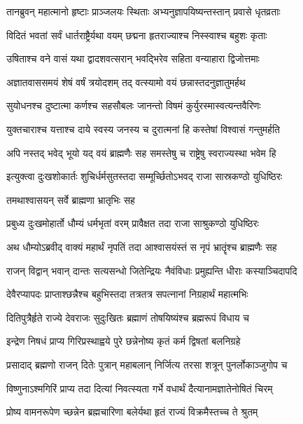 \twolineshloka
{तानब्रुवन् महात्मानो हृष्टाः प्राञ्जलयः स्थिताः}
{अभ्यनुज्ञापयिष्यन्तस्तान् प्रवासे धृतव्रताः}


\twolineshloka
{विदितं भवतां सर्वं धार्तराष्ट्रैर्यथा वयम्}
{छद्मना हृतराज्याश्च निस्स्वाश्च बहुशः कृताः}


\twolineshloka
{उषिताश्च वने वासं यथा द्वादशवत्सरान्}
{भवद्भिरेव सहिता वन्याहारा द्विजोत्तमाः}


\twolineshloka
{अज्ञातवाससमयं शेषं वर्षं त्रयोदशम्}
{तद् वत्स्यामो वयं छन्नास्तदनुज्ञातुमर्हथ}


\twolineshloka
{सुयोधनश्च दुष्टात्मा कर्णश्च सहसौबलः}
{जानन्तो विषमं कुर्युरस्मास्वत्यन्तवैरिणः}


\twolineshloka
{युक्तचाराश्च यत्ताश्च दाये स्वस्य जनस्य च}
{दुरात्मनां हि कस्तेषां विश्वासं गन्तुमर्हति}


\twolineshloka
{अपि नस्तद् भवेद् भूयो यद् वयं ब्राह्मणैः सह}
{समस्तेषु च राष्ट्रेषु स्वराज्यस्था भवेम हि}


\twolineshloka
{इत्युक्त्वा दुःखशोकार्तः शुचिर्धर्मसुतस्तदा}
{सम्मूर्च्छितोऽभवद् राजा सास्रकण्ठो युधिष्ठिरः}


\onelineshloka
{तमथाश्वासयन् सर्वे ब्राह्मणा भ्रातृभिः सह}

\twolineshloka
{प्रबुध्य दुःखमोहार्तो धौम्यं धर्मभृतां वरम्}
{प्रावैक्षत तदा राजा साश्रुकण्ठो युधिष्ठिरः}


\twolineshloka
{अथ धौम्योऽब्रवीद् वाक्यं महार्थं नृपतिं तदा}
{आश्वासयंस्तं स नृपं भ्रातॄंश्च ब्राह्मणैः सह}


\twolineshloka
{राजन् विद्वान् भवान् दान्तः सत्यसन्धो जितेन्द्रियः}
{नैवंविधाः प्रमुह्यन्ति धीराः कस्याञ्चिदापदि}


\twolineshloka
{देवैरप्यापदः प्राप्ताश्छन्नैश्च बहुभिस्तदा}
{तत्रतत्र सपत्नानां निग्रहार्थं महात्मभिः}


\twolineshloka
{दितिपुत्रैर्हृते राज्ये देवराजः सुदुःखितः}
{ब्रह्माणं तोषयिष्यंश्च ब्रह्मरूपं विधाय च}


\twolineshloka
{इन्द्रेण निषधं प्राप्य गिरिप्रस्थाह्वये पुरे}
{छन्नेनोष्य कृतं कर्म द्विषतां बलनिग्रहे}


\twolineshloka
{प्रसादाद् ब्रह्मणो राजन् दितेः पुत्रान् महाबलान्}
{निर्जित्य तरसा शत्रून् पुनर्लोकाञ्जुगोप च}


\twolineshloka
{विष्णुनाऽश्मगिरिं प्राप्य तदा दित्यां निवत्स्यता}
{गर्भे वधार्थं दैत्यानामज्ञातेनोषितं चिरम्}


\twolineshloka
{प्रोष्य वामनरूपेण च्छन्नेन ब्रह्मचारिणा}
{बलेर्यथा हृतं राज्यं विक्रमैस्तच्च ते श्रुतम्}


